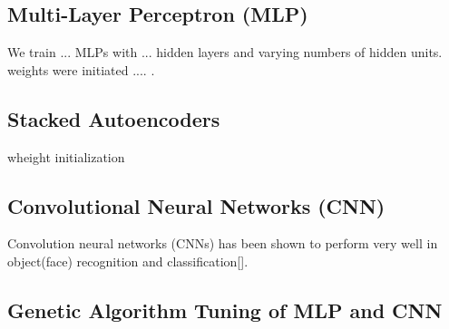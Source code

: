 \subsection{Multi-Layer Perceptron (MLP)}\label{Multi-Layer Perceptron(MLP)}
We train ... MLPs with ... hidden layers and varying numbers of hidden units.
weights were initiated .... .



\subsection{Stacked Autoencoders}\label{Stacked Autoencoders }
wheight initialization



\subsection{Convolutional Neural Networks (CNN)}\label{Convolutional Neural Networks (CNN)}
Convolution neural networks (CNNs) has been shown to perform very well in object(face) recognition and classification[].\par



\subsection{Genetic Algorithm Tuning of MLP and CNN}\label{Genetic Algorithm Tuning of MLP and CNN}